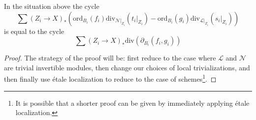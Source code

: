 %
\begin{lemma}
\label{lemma-key-formula}
In the situation above the cycle
$$
\sum
(Z_i \to X)_*\left(
\text{ord}_{B_i}(f_i) \text{div}_{\mathcal{N}|_{Z_i}}(t_i|_{Z_i}) -
\text{ord}_{B_i}(g_i) \text{div}_{\mathcal{L}|_{Z_i}}(s_i|_{Z_i}) \right)
$$
is equal to the cycle
$$
\sum (Z_i \to X)_*\text{div}(\partial_{B_i}(f_i, g_i))
$$
\end{lemma}

\begin{proof}
The strategy of the proof will be: first reduce to the case where
$\mathcal{L}$ and $\mathcal{N}$ are trivial invertible modules,
then change our choices of local trivializations, and then finally
use \'etale localization to reduce to the case of schemes\footnote{It
is possible that a shorter proof can be given by immediately
applying \'etale localization.}.


\end{proof}
